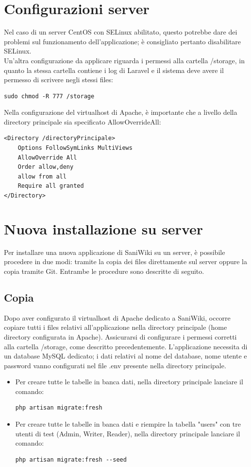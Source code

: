\documentclass[twoside]{supsistudent}
\begin{document}
\section{Configurazioni server}
Nel caso di un server CentOS con SELinux abilitato, questo potrebbe dare dei problemi sul funzionamento dell'applicazione; è consigliato pertanto disabilitare SELinux.\\
Un'altra configurazione da applicare riguarda i permessi alla cartella /storage, in quanto la stessa cartella contiene i log di Laravel e il sistema deve avere il permesso di scrivere negli stessi files:
\begin{verbatim}
sudo chmod -R 777 /storage
\end{verbatim}
Nella configurazione del virtualhost di Apache, è importante che a livello della directory principale sia specificato AllowOverrideAll:
\begin{verbatim}
<Directory /directoryPrincipale>
	Options FollowSymLinks MultiViews
	AllowOverride All
	Order allow,deny
	allow from all
	Require all granted
</Directory>
\end{verbatim}

\section{Nuova installazione su server}
Per installare una nuova applicazione di SaniWiki su un server, è possibile procedere in due modi: tramite la copia dei files direttamente sul server oppure la copia tramite Git. Entrambe le procedure sono descritte di seguito.

\subsection{Copia}
Dopo aver configurato il virtualhost di Apache dedicato a SaniWiki, occorre copiare tutti i files relativi all'applicazione nella directory principale (home directory configurata in Apache). Assicurarsi di configurare i permessi corretti alla cartella /storage, come descritto precedentemente. L'applicazione necessita di un database MySQL dedicato; i dati relativi al nome del database, nome utente e password vanno configurati nel file .env presente nella directory principale.\\
\begin{itemize}
\item Per creare tutte le tabelle in banca dati, nella directory principale lanciare il comando:
\begin{verbatim}
php artisan migrate:fresh
\end{verbatim}
\item Per creare tutte le tabelle in banca dati e riempire la tabella "users" con tre utenti di test (Admin, Writer, Reader), nella directory principale lanciare il comando:
\begin{verbatim}
php artisan migrate:fresh --seed
\end{verbatim}
\end{itemize}
\end{document}
